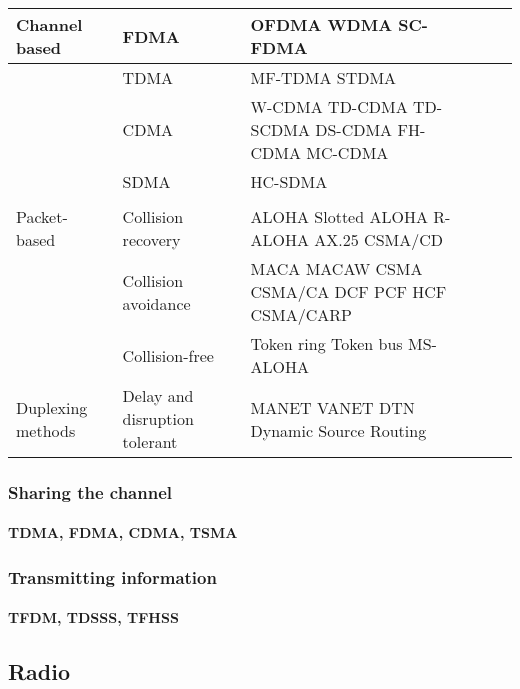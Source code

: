 \begin{table}[h!]
\scriptsize
	\begin{tabulary}{\columnwidth}{L|L|L|L|L}
	Channel based & FDMA                          & OFDMA WDMA SC-FDMA                              &  & \\\hline
	\             & TDMA                          & MF-TDMA STDMA                                   &  & \\\hline
	\             & CDMA                          & W-CDMA TD-CDMA TD-SCDMA DS-CDMA FH-CDMA MC-CDMA &  & \\\hline
	\             & SDMA                          & HC-SDMA                                         &  & \\\hline                                               &  & \\\hline
	Packet-based  & Collision recovery            & ALOHA Slotted ALOHA R-ALOHA AX.25 CSMA/CD       &  & \\\hline
	\             & Collision avoidance           & MACA MACAW CSMA CSMA/CA DCF PCF HCF CSMA/CARP   &  & \\\hline
	\             & Collision-free                & Token ring Token bus MS-ALOHA                   &  & \\\hline
	Duplexing methods  & Delay and disruption tolerant & MANET VANET DTN Dynamic Source Routing          &  & \\\hline

	\end{tabulary}
\caption{\label{tab:} }
\end{table}

\subsubsection{Sharing the channel}
\paragraph{TDMA, FDMA, CDMA, TSMA}

\subsubsection{Transmitting information}
\paragraph{TFDM, TDSSS, TFHSS}

\subsection{Radio}

